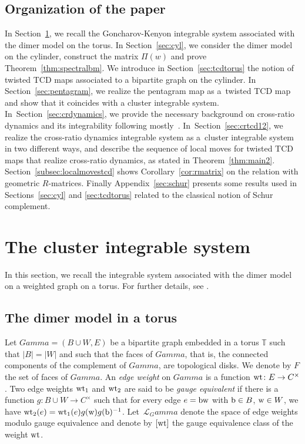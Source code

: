 \documentclass[10pt,a4paper]{amsart}
\numberwithin{equation}{section}
\newcommand{\C}{{\mathbb C}}
\newcommand{\T}{{\mathbb T}}
\newcommand{\ra}{\rightarrow}
\newcommand{\w}{{\rm w}}
\newcommand{\bw}{{\rm b}}
\def\Gamma{Gamma}
\def\C{C}
\begin{document}
	\subsection*{Organization of the paper}
	In Section~\ref{sec:gk}, we recall the Goncharov-Kenyon integrable system \cite{GK13} associated with the dimer model on the torus. In Section~\ref{sec:cyl}, we consider the dimer model on the cylinder, construct the matrix $\Pi(w)$ and prove Theorem~\ref{thm:spectralbm}. We introduce in Section~\ref{sec:tcdtorus} the notion of twisted TCD maps associated to a bipartite graph on the cylinder. In Section~\ref{sec:pentagram}, we realize the pentagram map as a~twisted TCD map and show that it coincides with a cluster integrable system. In~Section~\ref{sec:crdynamics}, we provide the necessary background on cross-ratio dynamics and its integrability following mostly~\cite{AFIT}. In~Section~\ref{sec:crtcd12}, we realize the cross-ratio dynamics integrable system as a~cluster integrable system in two different ways, and describe the sequence of local moves for twisted TCD maps that realize cross-ratio dynamics, as stated in Theorem~\ref{thm:main2}. Section~\ref{subsec:localmovestcd} shows Corollary~\ref{cor:rmatrix} on the relation with geometric $R$-matrices. Finally Appendix~\ref{sec:schur} presents some results used in Sections~\ref{sec:cyl} and \ref{sec:tcdtorus} related to the classical notion of Schur complement.
	
	
	\section{The cluster integrable system}
	\label{sec:gk}
	
	In this section, we recall the integrable system associated with the dimer model on a weighted graph on a torus. For further details, see \cite{GK13}.
	
	\subsection{The dimer model in a torus}
	
	Let $\Gamma=(B \cup W,E)$ be a bipartite graph embedded in a torus $\T$ such that $|B|=|W|$ and such that the faces of $\Gamma$, that is, the connected components of the complement of $\Gamma$, are topological disks. We denote by $F$ the set of faces of $\Gamma$. An \emph{edge weight} on $\Gamma$ is a function ${\rm wt}\colon E \ra \C^\times$. Two edge weights ${\rm wt}_1$ and ${\rm wt}_2$ are said to be \emph{gauge equivalent} if there is a function $g\colon B \cup W \ra \C^\times$ such that for every edge $e=\bw \w$ with ${\rm b} \in B$, ${\rm w}\in W$, we have ${\rm wt}_2(e)={\rm wt}_1(e) g({\rm w}) g({\rm b})^{-1}$. Let~$\mathcal L_\Gamma$ denote the space of edge weights modulo gauge equivalence {and denote by $[{\rm wt}]$ the gauge equivalence class of the weight ${\rm wt}$}.
	
\end{document}
